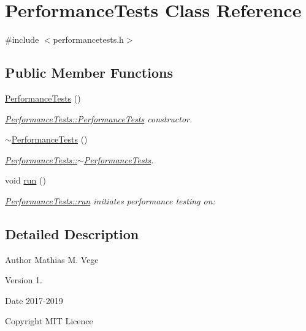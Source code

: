 \hypertarget{class_performance_tests}{}\section{Performance\+Tests Class Reference}
\label{class_performance_tests}


{\ttfamily \#include $<$performancetests.\+h$>$}

\subsection*{Public Member Functions}
\begin{DoxyCompactItemize}
\item 
\mbox{\hyperlink{class_performance_tests_ac8c32855dc70f74be063396bd6f76cf4}{Performance\+Tests}} ()
\begin{DoxyCompactList}\small\item\em \mbox{\hyperlink{class_performance_tests_ac8c32855dc70f74be063396bd6f76cf4}{Performance\+Tests\+::\+Performance\+Tests}} constructor. \end{DoxyCompactList}\item 
\mbox{\hyperlink{class_performance_tests_adc3a6beb9f16d8442cb9918dd2e9a8bb}{$\sim$\+Performance\+Tests}} ()
\begin{DoxyCompactList}\small\item\em \mbox{\hyperlink{class_performance_tests_adc3a6beb9f16d8442cb9918dd2e9a8bb}{Performance\+Tests\+::$\sim$\+Performance\+Tests}}. \end{DoxyCompactList}\item 
void \mbox{\hyperlink{class_performance_tests_aa55ebdbc84db93cc45adfdf7163f90b4}{run}} ()
\begin{DoxyCompactList}\small\item\em \mbox{\hyperlink{class_performance_tests_aa55ebdbc84db93cc45adfdf7163f90b4}{Performance\+Tests\+::run}} initiates performance testing on\+: \end{DoxyCompactList}\end{DoxyCompactItemize}


\subsection{Detailed Description}
\begin{DoxyAuthor}{Author}
Mathias M. Vege 
\end{DoxyAuthor}
\begin{DoxyVersion}{Version}
1. 
\end{DoxyVersion}
\begin{DoxyDate}{Date}
2017-\/2019 
\end{DoxyDate}
\begin{DoxyCopyright}{Copyright}
M\+IT Licence 
\end{DoxyCopyright}


